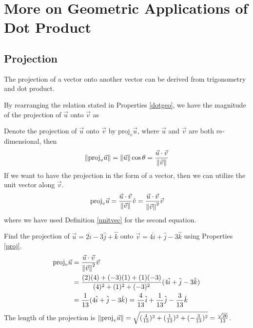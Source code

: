 \section{More on Geometric Applications of Dot Product}
\subsection{Projection}
The projection of a vector onto another vector can be derived from trigonometry and dot product. 
\begin{center}
\end{center}
By rearranging the relation stated in Properties \ref{dotgeo}, we have the magnitude of the projection of $\vec{u}$ onto $\vec{v}$ as
\begin{proper}
\label{proj}
Denote the projection of $\vec{u}$ onto $\vec{v}$ by $\text{proj}_v \vec{u}$, where $\vec{u}$ and $\vec{v}$ are both $m$-dimensional, then
\begin{align*}
\norm{\text{proj}_v \vec{u}} = \norm{\vec{u}} \cos\theta = \frac{\vec{u} \cdot \vec{v}}{\norm{\vec{v}}}    
\end{align*}
If we want to have the projection in the form of a vector, then we can utilize the unit vector along $\vec{v}$.
\begin{align*}
\text{proj}_v \vec{u} = \frac{\vec{u} \cdot \vec{v}}{\norm{\vec{v}}} \hat{v} = \frac{\vec{u} \cdot \vec{v}}{\norm{\vec{v}}^2} \vec{v} 
\end{align*}
where we have used Definition \ref{unitvec} for the second equation.
\end{proper}

\begin{exmp}
Find the projection of $\vec{u} = 2\hat{i} - 3\hat{j} + \hat{k}$ onto $\vec{v} = 4\hat{i} + \hat{j} - 3\hat{k}$ using Properties \ref{proj}.
\begin{align*}
\text{proj}_v \vec{u} &= \frac{\vec{u} \cdot \vec{v}}{\norm{\vec{v}}^2} \vec{v} \\
&= \frac{(2)(4)+(-3)(1)+(1)(-3)}{(4)^2+(1)^2+(-3)^2} (4\hat{i} + \hat{j} - 3\hat{k}) \\
&= \frac{1}{13} (4\hat{i} + \hat{j} - 3\hat{k}) = \frac{4}{13}\hat{i} + \frac{1}{13}\hat{j} - \frac{3}{13}\hat{k}
\end{align*}
The length of the projection is $\norm{\text{proj}_v \vec{u}} = \sqrt{(\frac{4}{13})^2 + (\frac{1}{13})^2 + (-\frac{3}{13})^2} = \frac{\sqrt{26}}{13}$.
\end{exmp}

